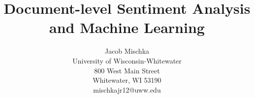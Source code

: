 \documentclass[letterpaper]{article}
\begin{document}
%
\title{Document-level Sentiment Analysis and Machine Learning}
\author{Jacob Mischka\\
University of Wisconsin-Whitewater\\
800 West Main Street\\
Whitewater, WI 53190\\
mischkajr12@uww.edu\\
}
\maketitle












\end{document}
